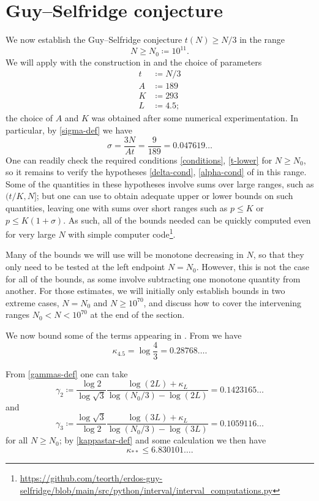 \documentclass[12pt,a4paper,reqno]{amsart}
\numberwithin{equation}{section}
\theoremstyle{plain}
\theoremstyle{definition}
\begin{document}
\section{Guy--Selfridge conjecture}

We now establish the Guy--Selfridge conjecture $t(N) \geq N/3$ in the range
$$ N \geq N_0 \coloneqq 10^{11}.$$
We will apply  with the construction in  and the choice of parameters
\begin{align*}
  t &\coloneqq N/3\\
  A &\coloneqq 189\\
  K &\coloneqq 293 \\
  L &\coloneqq 4.5;
\end{align*}
the choice of $A$ and $K$ was obtained after some numerical experimentation.  In particular, by \eqref{sigma-def} we have
$$ \sigma = \frac{3N}{At}=\frac{9}{189} =0.047619\dots$$
One can readily check the required conditions \eqref{conditions}, \eqref{t-lower} for $N \geq N_0$, so it remains to verify the hypotheses \eqref{delta-cond}, \eqref{alpha-cond} of  in this range.  Some of the quantities in these hypotheses involve sums over large ranges, such as $(t/K,N]$; but one can use  to obtain adequate upper or lower bounds on such quantities, leaving one with sums over short ranges such as $p \leq K$ or $p \leq K(1+\sigma)$.  As such, all of the bounds needed can be quickly computed even for very large $N$ with simple computer code\footnote{\url{https://github.com/teorth/erdos-guy-selfridge/blob/main/src/python/interval/interval_computations.py}}.

Many of the bounds we will use will be monotone decreasing in $N$, so that they only need to be tested at the left endpoint $N=N_0$.  However, this is not the case for all of the bounds, as some involve subtracting one monotone quantity from another.  For those estimates, we will initially only establish bounds in two extreme cases, $N=N_0$ and $N \geq 10^{70}$, and discuss how to cover the intervening ranges $N_0 < N < 10^{70}$ at the end of the section.
  
We now bound some of the terms appearing in . From  we have
$$ \kappa_{4.5} = \log \frac{4}{3} =0.28768\dots.$$

From \eqref{gammas-def} one can take
$$ \gamma_2 \coloneqq \frac{\log 2}{\log \sqrt{3}} \frac{\log(2L) + \kappa_L}{\log(N_0/3) - \log(2L)} = 0.1423165\dots$$
and
$$\gamma_3 \coloneqq \frac{\log \sqrt{3}}{\log 2} \frac{\log(3L) + \kappa_L}{\log(N_0/3) - \log(3L)} =  0.1059116 \dots$$
for all $N \geq N_0$; by \eqref{kappastar-def} and some calculation we then have
$$ \kappa_{**} \leq 6.830101\dots.$$
\end{document}
